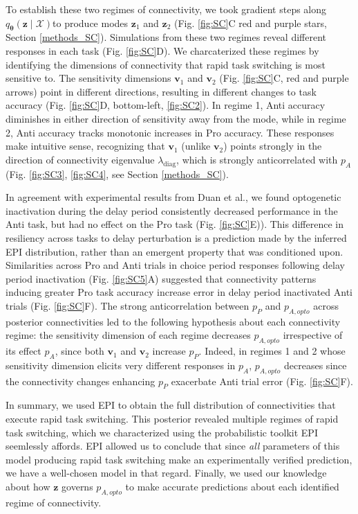 \documentclass[11pt]{article}
\begin{document}
To establish these two regimes of connectivity, we took gradient steps along $q_{\bm{\theta}}(\mathbf{z} \mid \mathcal{X})$to produce modes $\mathbf{z}_1$ and $\mathbf{z}_2$  (Fig. \ref{fig:SC}C red and purple stars, Section \ref{methods_SC}).
Simulations from these two regimes reveal different responses in each task (Fig. \ref{fig:SC}D).
We charcaterized these regimes by identifying the dimensions of connectivity that rapid task switching is most sensitive to.
The sensitivity dimensions $\mathbf{v}_1$ and  $\mathbf{v}_2$ (Fig. \ref{fig:SC}C, red and purple arrows) point in different directions, resulting in different changes to task accuracy (Fig. \ref{fig:SC}D, bottom-left, \ref{fig:SC2}).
In regime 1, Anti accuracy diminishes in either direction of sensitivity away from the mode, while in regime 2, Anti accuracy tracks monotonic increases in Pro accuracy.
These responses make intuitive sense, recognizing that $\mathbf{v}_1$ (unlike $\mathbf{v}_2$) points strongly in the direction of connectivity eigenvalue $\lambda_{\text{diag}}$, which is strongly anticorrelated with $p_A$ (Fig. \ref{fig:SC3}, \ref{fig:SC4}, see Section \ref{methods_SC}).

In agreement with experimental results from Duan et al., we found optogenetic inactivation during the delay period consistently decreased performance in the Anti task, but had no effect on the Pro task (Fig. \ref{fig:SC}E)).
This difference in resiliency across tasks to delay perturbation is a prediction made by the inferred EPI distribution, rather than an emergent property that was conditioned upon.
Similarities across Pro and Anti trials in choice period responses following delay period inactivation (Fig. \ref{fig:SC5}A) suggested that connectivity patterns inducing greater Pro task accuracy increase error in delay period inactivated Anti trials (Fig. \ref{fig:SC}F).
The strong anticorrelation between $p_P$ and $p_{A, opto}$ across posterior connectivities led to the following hypothesis about each connectivity regime: the sensitivity dimension of each regime decreases $p_{A,opto}$ irrespective of its effect $p_A$, since both $\mathbf{v}_1$ and $\mathbf{v}_2$ increase $p_P$.
Indeed, in regimes 1 and 2 whose sensitivity dimension elicits very different responses in $p_A$, $p_{A,opto}$ decreases since the connectivity changes enhancing $p_P$ exacerbate Anti trial error (Fig. \ref{fig:SC}F).

In summary, we used EPI to obtain the full distribution of connectivities that execute rapid task switching.
This posterior revealed multiple regimes of rapid task switching, which we characterized using the probabilistic toolkit EPI seemlessly affords.
EPI allowed us to conclude that since \textit{all} parameters of this model producing rapid task switching make an experimentally verified prediction, we have a well-chosen model in that regard.
Finally, we used our knowledge about how $\mathbf{z}$ governs $p_{A,opto}$ to make accurate predictions about each identified regime of connectivity.
\end{document}
